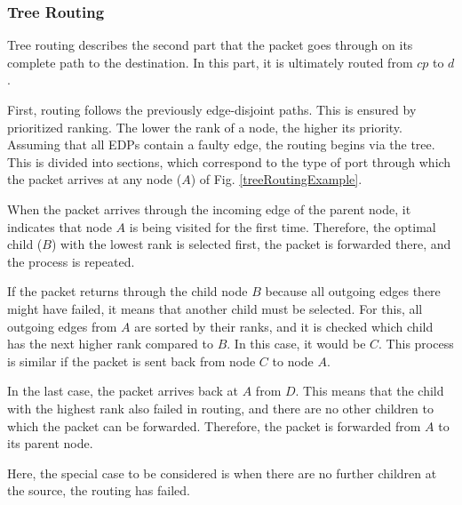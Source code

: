 \documentclass[a4paper,UKenglish,cleveref, autoref, thm-restate,dvipsnames]{lipics-v2021}
\begin{document}
\subsubsection{Tree Routing}
\label{routingTree}
Tree routing describes the second part that the packet goes through on its complete path to the destination. In this part, it is ultimately routed from $cp$ to $d$.

First, routing follows the previously edge-disjoint paths. This is ensured by prioritized ranking.
The lower the rank of a node, the higher its priority.
Assuming that all EDPs contain a faulty edge, the routing begins via the tree. This is divided into sections, which correspond to the type of port through which the packet arrives at any node ($A$) of Fig. \ref{treeRoutingExample}.

When the packet arrives through the incoming edge of the parent node, it indicates that node $A$ is being visited for the first time. Therefore, the optimal child ($B$) with the lowest rank is selected first, the packet is forwarded there, and the process is repeated.

If the packet returns through the child node $B$ because all outgoing edges there might have failed, it means that another child must be selected. For this, all outgoing edges from $A$ are sorted by their ranks, and it is checked which child has the next higher rank compared to $B$. In this case, it would be $C$. This process is similar if the packet is sent back from node $C$ to node $A$.

In the last case, the packet arrives back at $A$ from $D$. This means that the child with the highest rank also failed in routing, and there are no other children to which the packet can be forwarded. Therefore, the packet is forwarded from $A$ to its parent node.

Here, the special case to be considered is when there are no further children at the source, the routing has failed.
\end{document}
